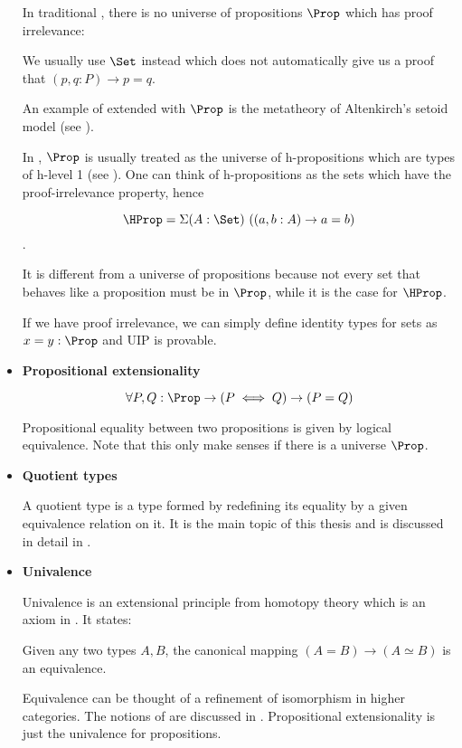 \begin{itemize}

In traditional \itt, there is no universe of propositions $\Prop$ which has proof irrelevance:


We usually use $\Set$ instead which does not automatically give us a proof that $(p, q : P) \to p = q$.


An example of \itt extended with $\Prop$ is the metatheory of Altenkirch's setoid model (see ).


In \hott, $\Prop$ is usually treated as the universe of h-propositions which are types of h-level 1 (see ). One can think of h-propositions as the sets which have the proof-irrelevance property, hence 

$$\HProp = \Sigma (A : \Set) ~((a, b : A) \to a = b)$$.

 It is different from a universe of propositions because not every set that behaves like a proposition must be in $\Prop$, while it is the case for $\HProp$. 


If we have proof irrelevance, we can simply define identity types for sets as $x = y : \Prop$ and UIP is provable.


\item \textbf{Propositional extensionality} 


\begin{equation}
\forall P, Q : \Prop \to (P \iff Q) \to (P = Q)
\end{equation}

Propositional equality between two propositions is given by logical equivalence. Note that this only make senses if there is a universe $\Prop$.

\item \textbf{Quotient types} 

A quotient type is a type formed by redefining its equality by a given equivalence relation on it. It is the main topic of this thesis and is discussed in detail in .

\item \textbf{Univalence}

Univalence is an extensional principle from homotopy theory which is an axiom in \hott. 
It states:

Given any two types $A,B$, the canonical mapping $(A = B) \to (A \simeq B)$ is an equivalence.

Equivalence can be thought of a refinement of isomorphism in higher categories. The notions of \hott are discussed in .
Propositional extensionality is just the univalence for propositions.
\end{itemize}

